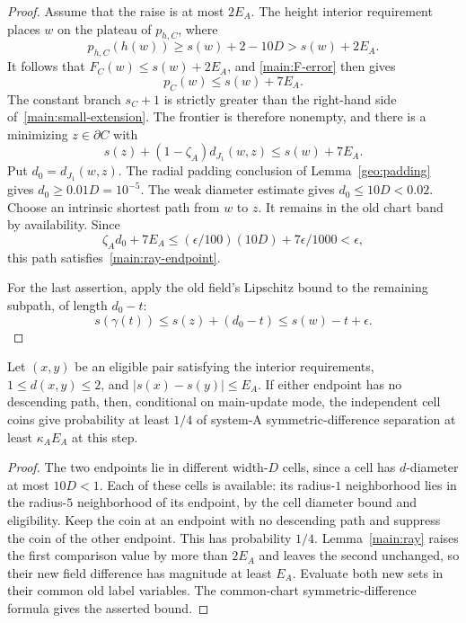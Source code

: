 \begin{proof}
Assume that the raise is at most $2E_A$.  The height interior
requirement places $w$ on the plateau of $p_{h,C}$, where
\[
 p_{h,C}(h(w))\ge s(w)+2-10D>s(w)+2E_A.
\]
It follows that $F_C(w)\le s(w)+2E_A$, and
\eqref{main:F-error} then gives
\begin{equation}
 p_C(w)\le s(w)+7E_A.
 \label{main:small-extension}
\end{equation}
The constant branch $s_C+1$ is strictly greater than the right-hand
side of~\eqref{main:small-extension}.  The frontier is therefore
nonempty, and there is a minimizing $z\in\partial C$ with
\[
 s(z)+(1-\zeta_A)d_{J_1}(w,z)\le s(w)+7E_A.
\]
Put $d_0=d_{J_1}(w,z)$.  The radial padding conclusion of
Lemma~\ref{geo:padding} gives $d_0\ge0.01D=10^{-5}$.
The weak diameter estimate gives $d_0\le10D<0.02$.
Choose an intrinsic shortest path from $w$ to $z$.  It remains in
the old chart band by availability.  Since
\[
 \zeta_A d_0+7E_A
 \le (\epsilon/100)(10D)+7\epsilon/1000<\epsilon,
\]
this path satisfies~\eqref{main:ray-endpoint}.

For the last assertion, apply the old field's Lipschitz bound to
the remaining subpath, of length $d_0-t$:
\[
 s(\gamma(t))\le s(z)+(d_0-t)
                 \le s(w)-t+\epsilon.
\]
\end{proof}

\begin{corollary}
\label{main:pair-separation}
Let $(x,y)$ be an eligible pair satisfying the interior requirements,
$1\le d(x,y)\le2$, and $|s(x)-s(y)|\le E_A$.  If either endpoint
has no descending path, then, conditional on main-update mode,
the independent cell coins give probability at least $1/4$ of
system-A symmetric-difference separation at least $\kappa_A E_A$
at this step.
\end{corollary}

\begin{proof}
The two endpoints lie in different width-$D$ cells, since a cell
has $d$-diameter at most $10D<1$.  Each of these cells is available:
its radius-$1$ neighborhood lies in the radius-$5$ neighborhood
of its endpoint, by the cell diameter bound and eligibility.
Keep the coin at an endpoint with no descending path and suppress
the coin of the other endpoint.  This has probability $1/4$.
Lemma~\ref{main:ray} raises the first comparison value by more
than $2E_A$ and leaves the second unchanged, so their new field
difference has magnitude at least $E_A$.  Evaluate both new sets
in their common old label variables.  The common-chart
symmetric-difference formula gives the asserted bound.
\end{proof}

